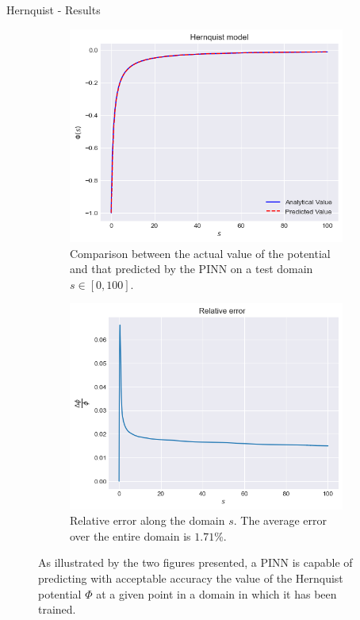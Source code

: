 \begin{frame}{Hernquist - Results}

\begin{figure}
    \centering
        \begin{subfigure}[b]{0.49\textwidth}
        \centering
        \includegraphics[width=\textwidth]{imgs/test-plot-hernquist.png}
        \caption{Comparison between the actual value of the potential and that predicted by the PINN on a test domain $s \in [0, 100]$.}
        \label{fig:test-plot-hernquist}
        \end{subfigure}
    \hfill
    \begin{subfigure}[b]{0.49\textwidth}
        \centering
        \includegraphics[width=\textwidth]{imgs/relative-error-hernquist.png}
        \caption{Relative error along the domain $s$. The average error over the entire domain is $1.71$\%.}
        \label{fig:relative-error-hernquist}
    \end{subfigure}
    \caption{As illustrated by the two figures presented, a PINN is capable of predicting with acceptable accuracy the value of the Hernquist potential $\Phi$ at a given point in a domain in which it has been trained.}
    \label{fig:three graphs}
\end{figure}
\end{frame}


